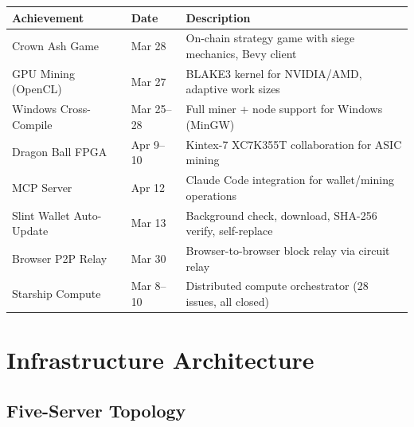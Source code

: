 \documentclass[12pt,a4paper]{article}
\begin{document}
\begin{center}
\begin{tabular}{@{}lll@{}}
\toprule
\textbf{Achievement} & \textbf{Date} & \textbf{Description} \\
\midrule
Crown Ash Game & Mar 28 & On-chain strategy game with siege mechanics, Bevy client \\
GPU Mining (OpenCL) & Mar 27 & BLAKE3 kernel for NVIDIA/AMD, adaptive work sizes \\
Windows Cross-Compile & Mar 25--28 & Full miner + node support for Windows (MinGW) \\
Dragon Ball FPGA & Apr 9--10 & Kintex-7 XC7K355T collaboration for ASIC mining \\
MCP Server & Apr 12 & Claude Code integration for wallet/mining operations \\
Slint Wallet Auto-Update & Mar 13 & Background check, download, SHA-256 verify, self-replace \\
Browser P2P Relay & Mar 30 & Browser-to-browser block relay via circuit relay \\
Starship Compute & Mar 8--10 & Distributed compute orchestrator (28 issues, all closed) \\
\bottomrule
\end{tabular}
\end{center}

\section{Infrastructure Architecture}

\subsection{Five-Server Topology}
\end{document}
